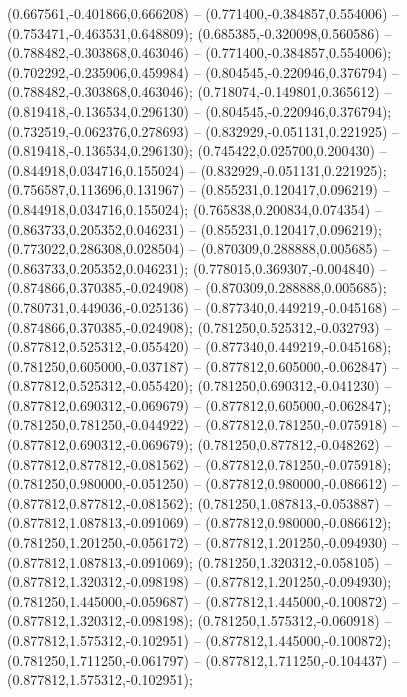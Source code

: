  (0.667561,-0.401866,0.666208) -- (0.771400,-0.384857,0.554006) -- (0.753471,-0.463531,0.648809);
 (0.685385,-0.320098,0.560586) -- (0.788482,-0.303868,0.463046) -- (0.771400,-0.384857,0.554006);
 (0.702292,-0.235906,0.459984) -- (0.804545,-0.220946,0.376794) -- (0.788482,-0.303868,0.463046);
 (0.718074,-0.149801,0.365612) -- (0.819418,-0.136534,0.296130) -- (0.804545,-0.220946,0.376794);
 (0.732519,-0.062376,0.278693) -- (0.832929,-0.051131,0.221925) -- (0.819418,-0.136534,0.296130);
 (0.745422,0.025700,0.200430) -- (0.844918,0.034716,0.155024) -- (0.832929,-0.051131,0.221925);
 (0.756587,0.113696,0.131967) -- (0.855231,0.120417,0.096219) -- (0.844918,0.034716,0.155024);
 (0.765838,0.200834,0.074354) -- (0.863733,0.205352,0.046231) -- (0.855231,0.120417,0.096219);
 (0.773022,0.286308,0.028504) -- (0.870309,0.288888,0.005685) -- (0.863733,0.205352,0.046231);
 (0.778015,0.369307,-0.004840) -- (0.874866,0.370385,-0.024908) -- (0.870309,0.288888,0.005685);
 (0.780731,0.449036,-0.025136) -- (0.877340,0.449219,-0.045168) -- (0.874866,0.370385,-0.024908);
 (0.781250,0.525312,-0.032793) -- (0.877812,0.525312,-0.055420) -- (0.877340,0.449219,-0.045168);
 (0.781250,0.605000,-0.037187) -- (0.877812,0.605000,-0.062847) -- (0.877812,0.525312,-0.055420);
 (0.781250,0.690312,-0.041230) -- (0.877812,0.690312,-0.069679) -- (0.877812,0.605000,-0.062847);
 (0.781250,0.781250,-0.044922) -- (0.877812,0.781250,-0.075918) -- (0.877812,0.690312,-0.069679);
 (0.781250,0.877812,-0.048262) -- (0.877812,0.877812,-0.081562) -- (0.877812,0.781250,-0.075918);
 (0.781250,0.980000,-0.051250) -- (0.877812,0.980000,-0.086612) -- (0.877812,0.877812,-0.081562);
 (0.781250,1.087813,-0.053887) -- (0.877812,1.087813,-0.091069) -- (0.877812,0.980000,-0.086612);
 (0.781250,1.201250,-0.056172) -- (0.877812,1.201250,-0.094930) -- (0.877812,1.087813,-0.091069);
 (0.781250,1.320312,-0.058105) -- (0.877812,1.320312,-0.098198) -- (0.877812,1.201250,-0.094930);
 (0.781250,1.445000,-0.059687) -- (0.877812,1.445000,-0.100872) -- (0.877812,1.320312,-0.098198);
 (0.781250,1.575312,-0.060918) -- (0.877812,1.575312,-0.102951) -- (0.877812,1.445000,-0.100872);
 (0.781250,1.711250,-0.061797) -- (0.877812,1.711250,-0.104437) -- (0.877812,1.575312,-0.102951);
